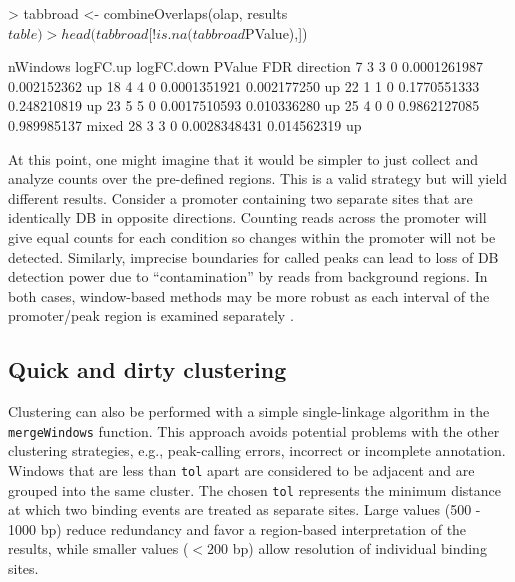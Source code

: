 \documentclass[12pt]{report}
\renewenvironment{Schunk}{\vspace{0pt}}{\vspace{0pt}}
\newcommand{\code}[1]{{\small\texttt{#1}}}
\begin{document}
\begin{Schunk}
\begin{Sinput}
> tabbroad <- combineOverlaps(olap, results$table)
> head(tabbroad[!is.na(tabbroad$PValue),])
\end{Sinput}
\begin{Soutput}
   nWindows logFC.up logFC.down       PValue         FDR direction
7         3        3          0 0.0001261987 0.002152362        up
18        4        4          0 0.0001351921 0.002177250        up
22        1        1          0 0.1770551333 0.248210819        up
23        5        5          0 0.0017510593 0.010336280        up
25        4        0          0 0.9862127085 0.989985137     mixed
28        3        3          0 0.0028348431 0.014562319        up
\end{Soutput}
\end{Schunk}

At this point, one might imagine that it would be simpler to just collect and analyze counts over the pre-defined regions. 
This is a valid strategy but will yield different results. 
Consider a promoter containing two separate sites that are identically DB in opposite directions. 
Counting reads across the promoter will give equal counts for each condition so changes within the promoter will not be detected. 
Similarly, imprecise boundaries for called peaks can lead to loss of DB detection power due to ``contamination'' by reads from background regions. 
In both cases, window-based methods may be more robust as each interval of the promoter/peak region is examined separately \citep{lun2014}.

\subsection{Quick and dirty clustering}
\label{sec:cluster}
Clustering can also be performed with a simple single-linkage algorithm in the \code{mergeWindows} function.
This approach avoids potential problems with the other clustering strategies, e.g., peak-calling errors, incorrect or incomplete annotation. 
Windows that are less than \code{tol} apart are considered to be adjacent and are grouped into the same cluster.
The chosen \code{tol} represents the minimum distance at which two binding events are treated as separate sites.
Large values (500 - 1000 bp) reduce redundancy and favor a region-based interpretation of the results, while smaller values ($< 200$ bp) allow resolution of individual binding sites.
\end{document}
